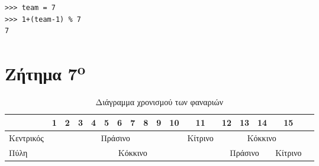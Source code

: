 \documentclass[a4paper,10pt]{article} \usepackage{anysize}
\begin{document}


\begin{verbatim}
>>> team = 7
>>> 1+(team-1) % 7
7
\end{verbatim}
\section*{Ζήτημα 7\textsuperscript{o}}

\begin{table}[h]
	\begin{tabular}{|l|c|c|c|c|c|c|c|c|c|c|c|c|c|c|c|c|}
	\hline
	& 1 & 2 & 3 & 4 & 5 & 6 & 7 & 8 & 9 & 10 & 11 & 12 & 13 & 14 & 15\\
	\hline
	Κεντρικός & \multicolumn{10}{c|}{\cellcolor{green}Πράσινο} &
	\cellcolor{yellow}Κίτρινο & \multicolumn{4}{c|}{\cellcolor{red}Κόκκινο}\\
	\hline
	Πύλη & \multicolumn{11}{c}{\cellcolor{red}Κόκκινο} &
	\multicolumn{3}{c|}{\cellcolor{green}Πράσινο} & \cellcolor{yellow}Κίτρινο\\
	\hline
	\end{tabular}
	\caption{Διάγραμμα χρονισμού των φαναριών}
\end{table}

\inputminted[linenos,obeytabs,frame=leftline,fontsize=\footnotesize]{oldasm}{files/fanaria.8085}
\section*{} 
\end{document}
